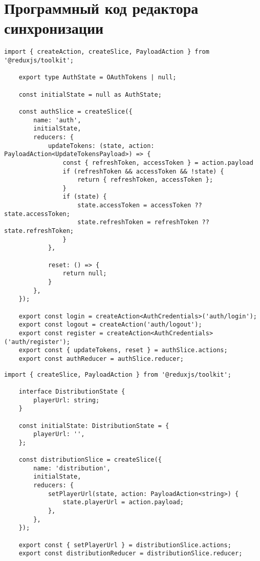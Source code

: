 \chapter{Программный код редактора синхронизации}

\begin{lstlisting}[caption={config/slice.ts}]
	import { createAction, createSlice, PayloadAction } from '@reduxjs/toolkit';
	
	export type AuthState = OAuthTokens | null;
	
	const initialState = null as AuthState;
	
	const authSlice = createSlice({
		name: 'auth',
		initialState,
		reducers: {
			updateTokens: (state, action: PayloadAction<UpdateTokensPayload>) => {
				const { refreshToken, accessToken } = action.payload
				if (refreshToken && accessToken && !state) {
					return { refreshToken, accessToken };
				}
				if (state) {
					state.accessToken = accessToken ?? state.accessToken;
					state.refreshToken = refreshToken ?? state.refreshToken;
				}
			},
			
			reset: () => {
				return null;
			}
		},
	});
	
	export const login = createAction<AuthCredentials>('auth/login');
	export const logout = createAction('auth/logout');
	export const register = createAction<AuthCredentials>('auth/register');
	export const { updateTokens, reset } = authSlice.actions;
	export const authReducer = authSlice.reducer;
\end{lstlisting}

\begin{lstlisting}[caption={distribution/slice.ts}]
	import { createSlice, PayloadAction } from '@reduxjs/toolkit';
	
	interface DistributionState {
		playerUrl: string;
	}
	
	const initialState: DistributionState = {
		playerUrl: '',
	};
	
	const distributionSlice = createSlice({
		name: 'distribution',
		initialState,
		reducers: {
			setPlayerUrl(state, action: PayloadAction<string>) {
				state.playerUrl = action.payload;
			},
		},
	});
	
	export const { setPlayerUrl } = distributionSlice.actions;
	export const distributionReducer = distributionSlice.reducer;
\end{lstlisting}

